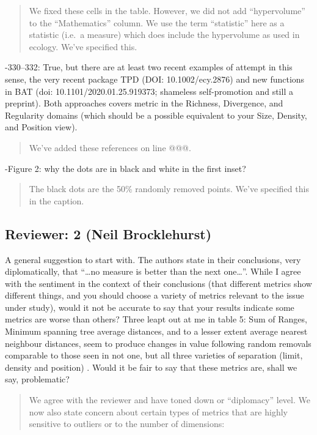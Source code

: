 \documentclass[]{article}
\begin{document}
\begin{quote}
We fixed these cells in the table. However, we did not add
``hypervolume'' to the ``Mathematics'' column. We use the term
``statistic'' here as a statistic (i.e.~a measure) which does include
the hypervolume as used in ecology. We've specified this.
\end{quote}

-330--332: True, but there are at least two recent examples of attempt
in this sense, the very recent package TPD (DOI: 10.1002/ecy.2876) and
new functions in BAT (doi: 10.1101/2020.01.25.919373; shameless
self-promotion and still a preprint). Both approaches covers metric in
the Richness, Divergence, and Regularity domains (which should be a
possible equivalent to your Size, Density, and Position view).

\begin{quote}
We've added these references on line @@@.
\end{quote}

-Figure 2: why the dots are in black and white in the first inset?

\begin{quote}
The black dots are the 50\% randomly removed points. We've specified
this in the caption.
\end{quote}

\subsection{Reviewer: 2 (Neil
Brocklehurst)}\label{reviewer-2-neil-brocklehurst}

A general suggestion to start with. The authors state in their
conclusions, very diplomatically, that ``\ldots{}no measure is better
than the next one\ldots{}''. While I agree with the sentiment in the
context of their conclusions (that different metrics show different
things, and you should choose a variety of metrics relevant to the issue
under study), would it not be accurate to say that your results indicate
some metrics are worse than others? Three leapt out at me in table 5:
Sum of Ranges, Minimum spanning tree average distances, and to a lesser
extent average nearest neighbour distances, seem to produce changes in
value following random removals comparable to those seen in not one, but
all three varieties of separation (limit, density and position) . Would
it be fair to say that these metrics are, shall we say, problematic?

\begin{quote}
We agree with the reviewer and have toned down or ``diplomacy'' level.
We now also state concern about certain types of metrics that are highly
sensitive to outliers or to the number of dimensions:
\end{quote}
\end{document}
